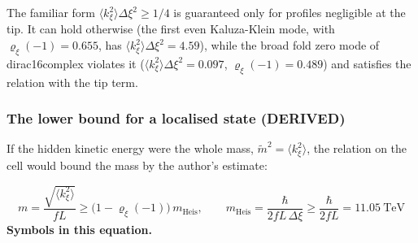 \documentclass[
  10pt,
]{article}
\begin{document}
The familiar form \(\langle k_\xi^2\rangle\Delta\xi^2 \ge 1/4\) is
guaranteed only for profiles negligible at the tip. It can hold
otherwise (the first even Kaluza-Klein mode, with
\(\varrho_\xi(-1) = 0.655\), has
\(\langle k_\xi^2\rangle\Delta\xi^2 = 4.59\)), while the broad fold zero
mode of dirac16complex violates it
(\(\langle k_\xi^2\rangle\Delta\xi^2 = 0.097\),
\(\varrho_\xi(-1) = 0.489\)) and satisfies the relation with the tip
term.

\hypertarget{the-lower-bound-for-a-localised-state-derived}{%
\subsubsection*{The lower bound for a localised state
(DERIVED)}\label{the-lower-bound-for-a-localised-state-derived}}

If the hidden kinetic energy were the whole mass,
\(\tilde m^2 = \langle k_\xi^2\rangle\), the relation on the cell would
bound the mass by the author's estimate:

\[ m = \frac{\sqrt{\langle k_\xi^2\rangle}}{fL} \ge \big(1 - \varrho_\xi(-1)\big)\,m_{\mathrm{Heis}},\qquad m_{\mathrm{Heis}} = \frac{\hbar}{2fL\,\Delta\xi} \ge \frac{\hbar}{2fL} = 11.05\ \text{TeV} \]
\textbf{Symbols in this equation.}
\end{document}
